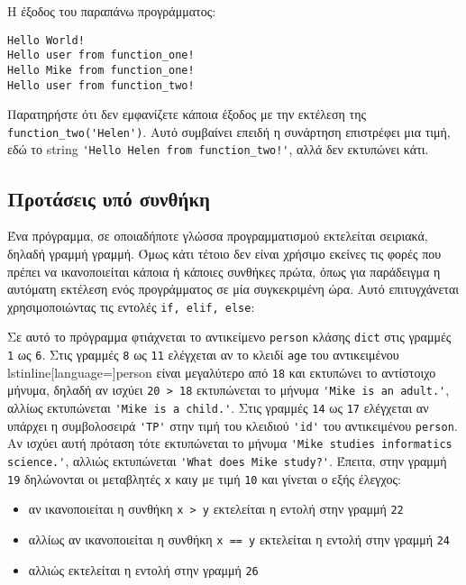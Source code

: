 \documentclass[14pt]{extreport}
\begin{document}


Η έξοδος του παραπάνω προγράμματος:

\begin{lstlisting}[language={}]
Hello World!
Hello user from function_one!
Hello Mike from function_one!
Hello user from function_two!
\end{lstlisting}

Παρατηρήστε ότι δεν εμφανίζετε κάποια έξοδος με την εκτέλεση της \lstinline{function_two('Helen')}. Αυτό συμβαίνει επειδή η συνάρτηση επιστρέφει μια τιμή, εδώ το string \lstinline{'Hello Helen from function_two!'}, αλλά δεν εκτυπώνει κάτι.

\subsection{Προτάσεις υπό συνθήκη}
Ένα πρόγραμμα, σε οποιαδήποτε γλώσσα προγραμματισμού εκτελείται σειριακά, δηλαδή γραμμή γραμμή. Όμως κάτι τέτοιο δεν είναι χρήσιμο εκείνες τις φορές που πρέπει να ικανοποιείται κάποια ή κάποιες συνθήκες πρώτα, όπως για παράδειγμα η αυτόματη εκτέλεση ενός προγράμματος σε μία συγκεκριμένη ώρα. Αυτό επιτυγχάνεται χρησιμοποιώντας τις εντολές \lstinline{if, elif, else}:



Σε αυτό το πρόγραμμα φτιάχνεται το αντικείμενο \lstinline{person} κλάσης \lstinline{dict} στις γραμμές \lstinline{1} ως \lstinline{6}. Στις γραμμές \lstinline{8} ως \lstinline{11} ελέγχεται αν το κλειδί \lstinline[language={}]{age} του αντικειμένου lstinline[language={}]{person} είναι μεγαλύτερο από \lstinline{18} και εκτυπώνει το αντίστοιχο μήνυμα, δηλαδή αν ισχύει \lstinline{20 > 18} εκτυπώνεται το μήνυμα \lstinline[language={}]{'Mike is an adult.'}, αλλίως εκτυπώνεται \lstinline[language={}]{'Mike is a child.'}. Στις γραμμές \lstinline{14} ως \lstinline{17} ελέγχεται αν υπάρχει η συμβολοσειρά \lstinline[language={}]{'TP'} στην τιμή του κλειδιού \lstinline[language={}]{'id'} του αντικειμένου \lstinline[language={}]{person}. Αν ισχύει αυτή πρόταση τότε εκτυπώνεται το μήνυμα \lstinline[language={}]{'Mike studies informatics science.'}, αλλιώς εκτυπώνεται \lstinline[language={}]{'What does Mike study?'}. Έπειτα, στην γραμμή \lstinline{19} δηλώνονται οι μεταβλητές \lstinline{x} και\lstinline{y} με τιμή \lstinline{10} και γίνεται ο εξής έλεγχος:
\begin{itemize}
    \itemsep0cm
    \item αν ικανοποιείται η συνθήκη \lstinline{x > y} εκτελείται η εντολή στην γραμμή \lstinline{22}
    \item αλλίως αν ικανοποιείται η συνθήκη \lstinline{x == y} εκτελείται η εντολή στην γραμμή \lstinline{24}
    \item αλλιώς εκτελείται η εντολή στην γραμμή \lstinline{26}
\end{itemize}
\end{document}

